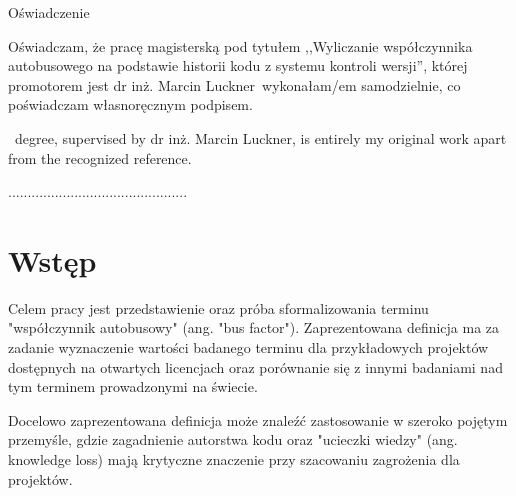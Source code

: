\documentclass[a4paper,11pt,twoside]{report}
\theoremstyle{definition}
\newcommand{\tytul}{Wyliczanie współczynnika autobusowego na podstawie 
historii kodu z systemu kontroli wersji}
\renewcommand{\title}{Calculating bus factor based on VCS log}
\newcommand{\type}{magisters} %
\newcommand{\supervisor}{dr inż. Marcin Luckner}
\begin{document}
\par\vspace{5cm}

\begin{center}
Oświadczenie %
\end{center}

\indent Oświadczam, że pracę \type ką pod
tytułem ,,\tytul '', której promotorem jest \supervisor \ wykonałam/em
samodzielnie, co poświadczam własnoręcznym podpisem.
\vspace{2cm}


~degree, supervised  by \supervisor , is entirely my original work apart from 
the recognized reference.

\begin{flushright}
  \begin{minipage}{50mm}
    \begin{center}
      ..............................................

    \end{center}
  \end{minipage}
\end{flushright}

\thispagestyle{empty}
\newpage

\null\thispagestyle{empty}\newpage

\tableofcontents
\thispagestyle{empty}
\newpage
\null\thispagestyle{empty}\newpage
\setcounter{page}{11}
\pagestyle{fancy}


\chapter*{Wstęp} %

Celem pracy jest przedstawienie oraz próba sformalizowania terminu 
"współczynnik autobusowy" (ang. "bus factor").
Zaprezentowana definicja ma za zadanie wyznaczenie wartości badanego terminu 
dla przykładowych projektów dostępnych 
na otwartych licencjach oraz porównanie się z innymi badaniami nad tym 
terminem prowadzonymi na świecie.

Docelowo zaprezentowana definicja może znaleźć zastosowanie w szeroko 
pojętym przemyśle, gdzie zagadnienie 
autorstwa kodu oraz "ucieczki wiedzy" (ang. knowledge loss) mają krytyczne 
znaczenie przy szacowaniu 
zagrożenia dla projektów.
\end{document}
